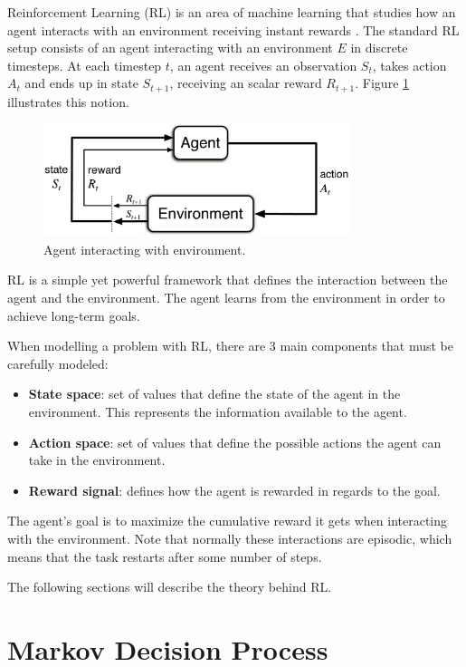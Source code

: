 Reinforcement Learning (RL) is an area of machine learning that studies how an agent interacts with an environment receiving instant rewards \cite{Sutton1998}.
The standard RL setup consists of an agent interacting with an environment $E$ in discrete timesteps. 
At each timestep $t$, an agent receives an observation $S_t$, takes action $A_t$ and ends up in state $S_{t+1}$, receiving an 
scalar reward $R_{t+1}$.
Figure \ref{fig:RL_image} illustrates this notion.

\begin{figure}[b]
    \centering
    \includegraphics[width=0.8\textwidth]{Chapter2/RL_image.pdf} 
    \caption{Agent interacting with environment.}
    \label{fig:RL_image}
\end{figure}

RL is a simple yet powerful framework that defines the interaction between the agent and the environment. 
The agent learns from the environment in order to achieve long-term goals.

When modelling a problem with RL, there are 3 main components that must be carefully modeled:

\begin{itemize}
    \item \textbf{State space}: set of values that define the state of the agent in the environment.
    This represents the information available to the agent.
    \item \textbf{Action space}: set of values that define the possible actions the agent can take in the environment.
    \item \textbf{Reward signal}: defines how the agent is rewarded in regards to the goal.
\end{itemize}

The agent's goal is to maximize the cumulative reward it gets when interacting with the environment.
Note that normally these interactions are episodic, which means that the task restarts after some number of steps.

The following sections will describe the theory behind RL.

\section{Markov Decision Process}

